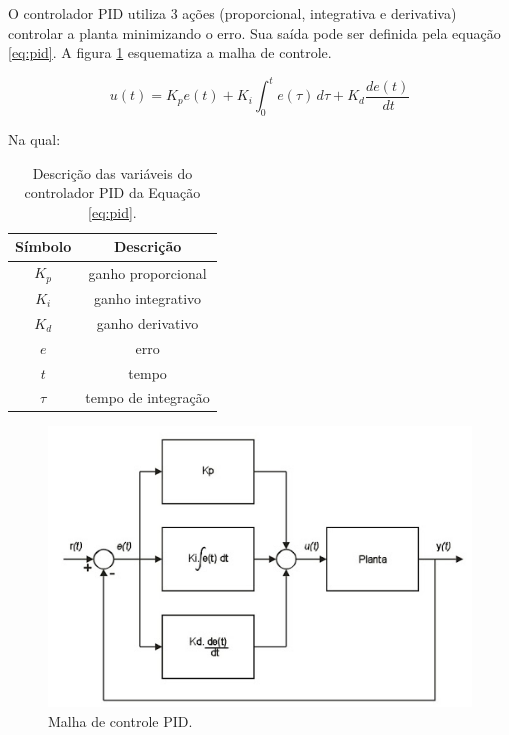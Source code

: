 O controlador PID utiliza 3 ações (proporcional, integrativa e derivativa) controlar a planta minimizando o erro. Sua saída pode ser definida pela equação \ref{eq:pid}. A figura \ref{fig:pid} esquematiza a malha de controle.

\begin{equation}
    u(t) = K_pe(t) + K_i  \int_{0}^{t} e(\tau) \, d\tau + K_d\dfrac{de(t)}{\, dt}
    \label{eq:pid}
\end{equation}

Na qual:

\begin{table}[H]
    \begin{center}
        \begin{tabular}{ |c|c| } 
            \hline
            Símbolo   &  Descrição  \\
            \hline
            \(K_p\)   &  ganho proporcional  \\
            \hline
            \(K_i\)   &  ganho integrativo  \\
            \hline
            \(K_d\)   &  ganho derivativo  \\
            \hline
            \(e\)   &  erro  \\
            \hline
            \(t\)   &  tempo  \\
            \hline
            \(\tau\)   &  tempo de integração \\
            \hline
        \end{tabular}
        \caption{\label{tab:variaveis_pid}Descrição das variáveis do controlador PID da Equação \ref{eq:pid}.}
    \end{center}
\end{table}

\begin{figure}[h]
    \centering
    \includegraphics[scale=0.60]{figuras/implementacao/hardware/pid.jpg}
    \caption{Malha de controle PID.}
    \label{fig:pid}
\end{figure}


